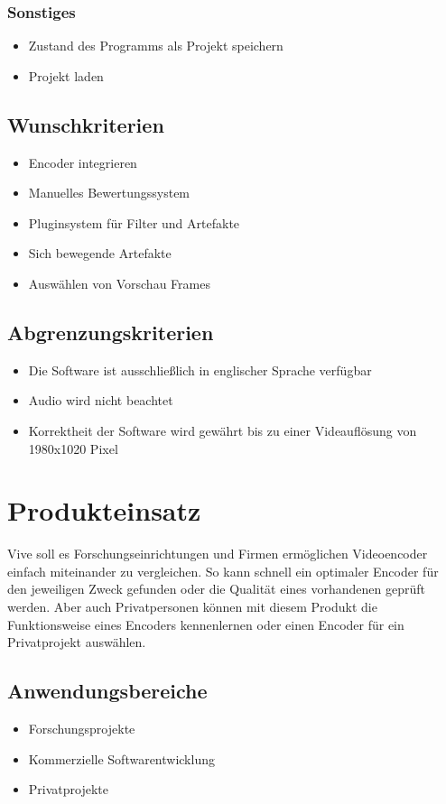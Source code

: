 \documentclass[parskip=full]{scrartcl}
\begin{document}
\subsubsection{Sonstiges}
\begin{itemize}
\item Zustand des Programms als Projekt speichern
\item Projekt laden
\end{itemize}
\subsection{Wunschkriterien}
\begin{itemize}
\item Encoder integrieren
\item Manuelles Bewertungssystem
\item Pluginsystem für Filter und Artefakte
\item Sich bewegende Artefakte
\item Auswählen von Vorschau Frames
\end{itemize}
\subsection{Abgrenzungskriterien}
\begin{itemize}
\item Die Software ist ausschließlich in englischer Sprache verfügbar
\item Audio wird nicht beachtet
\item Korrektheit der Software wird gewährt bis zu einer Videauflösung von 1980x1020 Pixel
\end{itemize}
\newpage
\section{Produkteinsatz}
Vive soll es Forschungseinrichtungen und Firmen ermöglichen Videoencoder einfach
miteinander zu vergleichen. So kann schnell ein optimaler Encoder für den jeweiligen Zweck
gefunden oder die Qualität eines vorhandenen geprüft werden. Aber auch Privatpersonen können
mit diesem Produkt die Funktionsweise eines Encoders kennenlernen oder einen Encoder für ein
Privatprojekt auswählen.
\subsection{Anwendungsbereiche}
\begin{itemize}
\item Forschungsprojekte
\item Kommerzielle Softwarentwicklung
\item Privatprojekte
\end{itemize}
\end{document}
